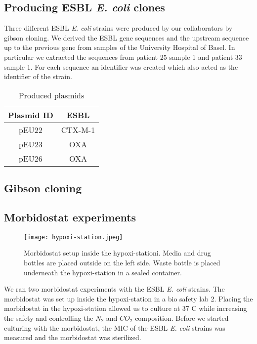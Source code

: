 \subsection{Producing ESBL \textit{E. coli} clones}
Three different ESBL \textit{E. coli} strains were produced by our collaborators by gibson cloning. We derived the ESBL gene sequences and the upstream sequence up to the previous gene from samples of the University Hospital of Basel. In particular we extracted the sequences from patient 25 sample 1 and patient 33 sample 1. 
For each sequence an identifier was created which also acted as the identifier of the strain.

\begin{table}[H]
	\begin{tabular}{|c c|}	
		\hline
		Plasmid ID & ESBL \\
		\hline
		pEU22 & CTX-M-1 \\
		\hline
		pEU23 & OXA \\
		\hline
		pEU26 & OXA \\
		\hline
	\end{tabular}
	\label{table:plasmid}
	\caption{Produced plasmids}
\end{table}
\subsection{Gibson cloning}

\subsection{Morbidostat experiments}
\begin{figure}
	\texttt{[image: hypoxi-station.jpeg]}
	\caption{Morbidostat setup inside the hypoxi-stationi. Media and drug bottles are placed outside on the left side. Waste bottle is placed underneath the hypoxi-station in a sealed container.} 
\end{figure}
We ran two morbidostat experiments with the ESBL \textit{E. coli} strains. The morbidostat was set up inside the hypoxi-station in a bio safety lab 2. Placing the morbidostat in the hypoxi-station allowed us to culture at 37 \degree C while increasing the safety and controlling the $N_2$ and $CO_2$ composition. Before we started culturing with the morbidostat, the MIC of the ESBL \textit{E. coli} strains was measured and the morbidostat was sterilized.
